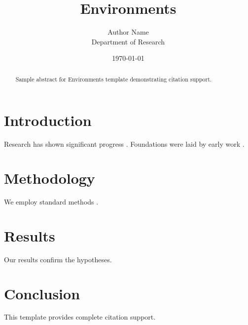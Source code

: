 \documentclass{mdpi}
\title{Environments}
\author{Author Name \\ \small Department of Research}
\date{\today}
\begin{document}
\maketitle

\begin{abstract}
Sample abstract for Environments template demonstrating citation support.
\end{abstract}

\section{Introduction}
Research has shown significant progress \citep{einstein1905}. Foundations were laid by early work \citep{turing1950}.

\section{Methodology}
We employ standard methods \citep{knuth1984}.

\section{Results}
Our results confirm the hypotheses.

\section{Conclusion}
This template provides complete citation support.



\end{document}

